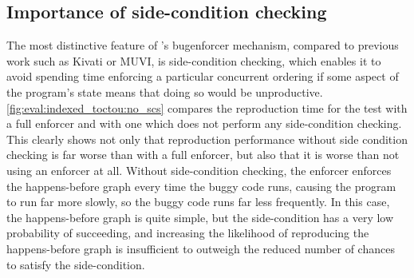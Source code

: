 

\subsection{Importance of side-condition checking}

The most distinctive feature of {\technique}'s \gls{bugenforcer}
mechanism, compared to previous work such as Kivati\cite{Chew2010} or
MUVI\cite{Lu2007}, is side-condition checking, which enables it to
avoid spending time enforcing a particular concurrent ordering if some
aspect of the program's state means that doing so would be
unproductive.  \autoref{fig:eval:indexed_toctou:no_scs} compares the
reproduction time for the  test with a full enforcer
and with one which does not perform any side-condition checking.  This
clearly shows not only that reproduction performance without side
condition checking is far worse than with a full enforcer, but also
that it is worse than not using an enforcer at all.  Without
side-condition checking, the enforcer enforces the happens-before
graph every time the buggy code runs, causing the program to run far
more slowly, so the buggy code runs far less frequently.  In this
case, the happens-before graph is quite simple, but the side-condition
has a very low probability of succeeding, and increasing the
likelihood of reproducing the happens-before graph is insufficient to
outweigh the reduced number of chances to satisfy the
side-condition.

